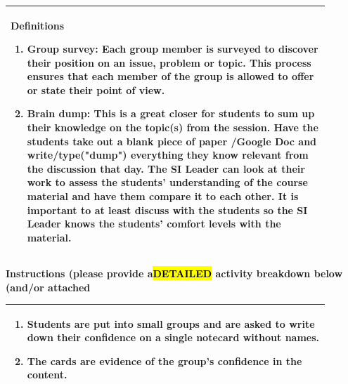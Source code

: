 \documentclass{article}
\begin{document}
\vspace{0.5cm}
\noindent
\begin{tabular}{|p{0.9\linewidth}|}
\hline
{\large\textbf{Definitions}}
\begin{enumerate}
   \item\textbf{Group survey:} Each group member is surveyed to discover their position on an issue, problem or topic. This process ensures that each member of the group is allowed to offer or state their point of view.
   \item\textbf{Brain dump:} This is a great closer for students to sum up their knowledge on the topic(s) from the session. Have the students take out a blank piece of paper /Google Doc and write/type("dump") everything they know relevant from the discussion that day. The SI Leader can look at their work to assess the students' understanding of the course material and have them compare it to each other. It is important to at least discuss with the students so the SI Leader knows the students' comfort levels with the material. 
\end{enumerate}
\\ \hline
\end{tabular}

\newpage
\noindent
{\large\textbf{Instructions (please provide a\hl{DETAILED} activity breakdown below (and/or attached}}

\begin{tabular}{|p{0.9\linewidth}|}
\hline
\begin{enumerate}[itemsep=0.3em]
   \item Students are put into small groups and are asked to write down their confidence on a single notecard without names.
   \item The cards are evidence of the group's confidence in the content.
\end{enumerate}
\\ \hline
\end{tabular}
\end{document}
